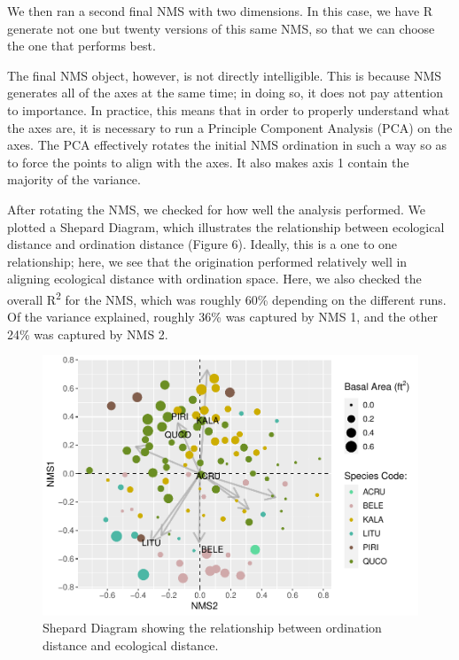 \documentclass[
  12pt,
]{article}
\begin{document}
We then ran a second final NMS with two dimensions. In this case, we
have R generate not one but twenty versions of this same NMS, so that we
can choose the one that performs best.

The final NMS object, however, is not directly intelligible. This is
because NMS generates all of the axes at the same time; in doing so, it
does not pay attention to importance. In practice, this means that in
order to properly understand what the axes are, it is necessary to run a
Principle Component Analysis (PCA) on the axes. The PCA effectively
rotates the initial NMS ordination in such a way so as to force the
points to align with the axes. It also makes axis 1 contain the majority
of the variance.

After rotating the NMS, we checked for how well the analysis performed.
We plotted a Shepard Diagram, which illustrates the relationship between
ecological distance and ordination distance (Figure 6). Ideally, this is
a one to one relationship; here, we see that the origination performed
relatively well in aligning ecological distance with ordination space.
Here, we also checked the overall R\textsuperscript{2} for the NMS,
which was roughly 60\% depending on the different runs. Of the variance
explained, roughly 36\% was captured by NMS 1, and the other 24\% was
captured by NMS 2.

\begin{figure}
\centering
\includegraphics{ProjectDraft_files/figure-latex/unnamed-chunk-13-1.pdf}
\caption{Shepard Diagram showing the relationship between ordination
distance and ecological distance.}
\end{figure}
\end{document}
